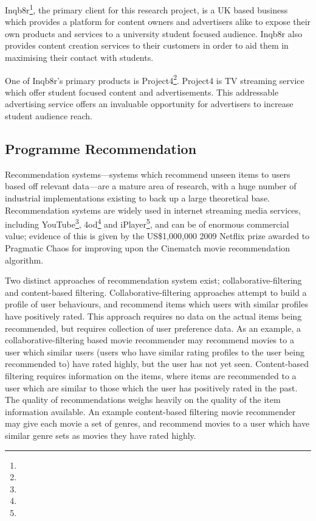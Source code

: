 	Inqb8r\footnote{}, the primary client for this research project, is a UK based business which provides a platform for content owners and advertisers alike to expose their own products and services to a university student focused audience. Inqb8r also provides content creation services to their customers in order to aid them in maximising their contact with students.

	One of Inqb8r's primary products is Project4\footnote{}. Project4 is TV streaming service which offer student focused content and advertisements. This addressable advertising service offers an invaluable opportunity for advertisers to increase student audience reach.

	\subsection{Programme Recommendation}

	Recommendation systems---systems which recommend unseen items to users based off relevant data---are a mature area of research, with a huge number of industrial implementations existing to back up a large theoretical base. Recommendation systems are widely used in internet streaming media services, including YouTube\footnote{}, 4od\footnote{} and iPlayer\footnote{}, and can be of enormous commercial value; evidence of this is given by the US\$1,000,000 2009 Netflix prize awarded to Pragmatic Chaos \citep{pragmatic_chaos} for improving upon the Cinematch movie recommendation algorithm.

	Two distinct approaches of recommendation system exist; collaborative-filtering and content-based filtering. Collaborative-filtering approaches attempt to build a profile of user behaviours, and recommend items which users with similar profiles have positively rated. This approach requires no data on the actual items being recommended, but requires collection of user preference data. As an example, a collaborative-filtering based movie recommender may recommend movies to a user which similar users (users who have similar rating profiles to the user being recommended to) have rated highly, but the user has not yet seen. Content-based filtering requires information on the items, where items are recommended to a user which are similar to those which the user has positively rated in the past. The quality of recommendations weighs heavily on the quality of the item information available. An example content-based filtering movie recommender may give each movie a set of genres, and recommend movies to a user which have similar genre sets as movies they have rated highly.

